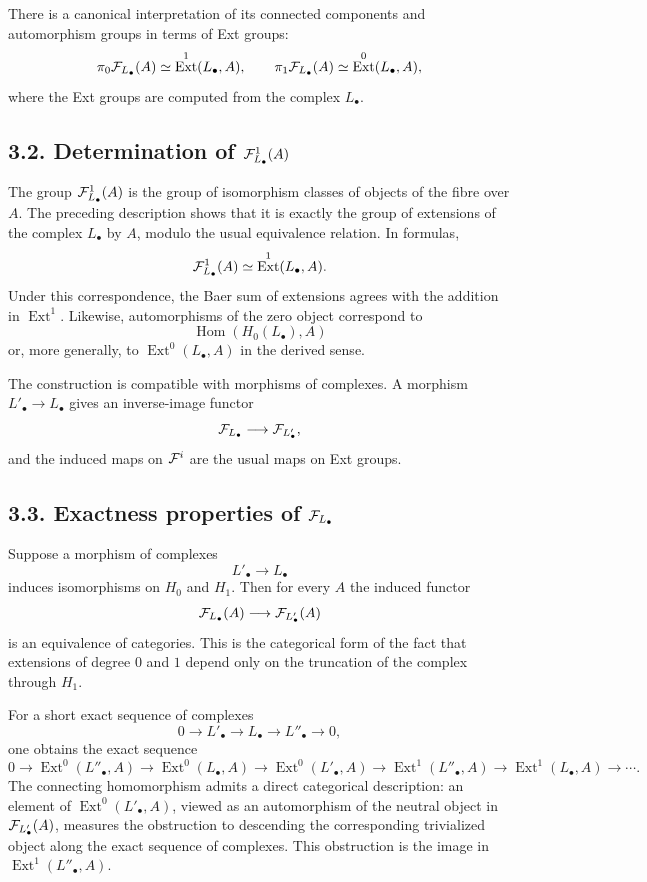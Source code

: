 \documentclass[11pt]{article}
\theoremstyle{plain}
\theoremstyle{definition}
\theoremstyle{remark}
\DeclareMathOperator{\Hom}{Hom}
\DeclareMathOperator{\Ext}{Ext}
\begin{document}
There is a canonical interpretation of its connected components and automorphism
groups in terms of Ext groups:
\[
\pi_0\cF_{L_\bullet}(A)\simeq \Ext^1(L_\bullet,A),\qquad
\pi_1\cF_{L_\bullet}(A)\simeq \Ext^0(L_\bullet,A),
\]
where the Ext groups are computed from the complex \(L_\bullet\).

\subsection*{3.2. Determination of \(\mathcal F^1_{L_\bullet}(A)\)}

The group \(\mathcal F^1_{L_\bullet}(A)\) is the group of isomorphism classes of objects
of the fibre over \(A\). The preceding description shows that it is exactly the
group of extensions of the complex \(L_\bullet\) by \(A\), modulo the usual
equivalence relation. In formulas,
\[
\cF^1_{L_\bullet}(A)\simeq \Ext^1(L_\bullet,A).
\]
Under this correspondence, the Baer sum of extensions agrees with the addition
in \(\Ext^1\). Likewise, automorphisms of the zero object correspond to
\[
\Hom(H_0(L_\bullet),A)
\]
or, more generally, to \(\Ext^0(L_\bullet,A)\) in the derived sense.

The construction is compatible with morphisms of complexes. A morphism
\(L'_\bullet\to L_\bullet\) gives an inverse-image functor
\[
\mathcal F_{L_\bullet}\longrightarrow \mathcal F_{L'_\bullet},
\]
and the induced maps on \(\mathcal F^i\) are the usual maps on Ext groups.

\subsection*{3.3. Exactness properties of \(\mathcal F_{L_\bullet}\)}

Suppose a morphism of complexes
\[
L'_\bullet\longrightarrow L_\bullet
\]
induces isomorphisms on \(H_0\) and \(H_1\). Then for every \(A\) the induced
functor
\[
\mathcal F_{L_\bullet}(A)\longrightarrow \mathcal F_{L'_\bullet}(A)
\]
is an equivalence of categories. This is the categorical form of the fact that
extensions of degree \(0\) and \(1\) depend only on the truncation of the complex
through \(H_1\).

For a short exact sequence of complexes
\[
0\longrightarrow L'_\bullet\longrightarrow L_\bullet
        \longrightarrow L''_\bullet\longrightarrow 0,
\]
one obtains the exact sequence
\[
0\to \Ext^0(L''_\bullet,A)\to \Ext^0(L_\bullet,A)
\to \Ext^0(L'_\bullet,A)
\to \Ext^1(L''_\bullet,A)\to \Ext^1(L_\bullet,A)\to\cdots .
\]
The connecting homomorphism admits a direct categorical description: an element
of \(\Ext^0(L'_\bullet,A)\), viewed as an automorphism of the neutral object in
\(\mathcal F_{L'_\bullet}(A)\), measures the obstruction to descending the corresponding
trivialized object along the exact sequence of complexes. This obstruction is the
image in \(\Ext^1(L''_\bullet,A)\).
\end{document}
